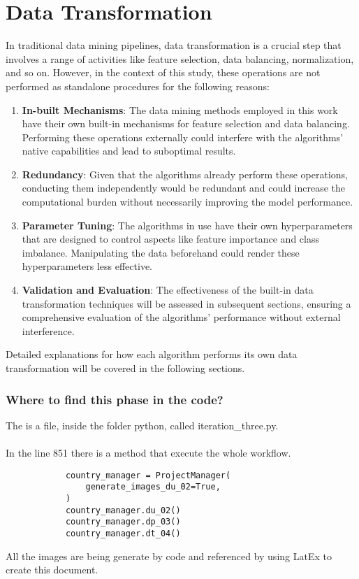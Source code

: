 \part{Data Transformation}

    In traditional data mining pipelines, data transformation is a crucial step that involves a range of activities like feature selection, data balancing, normalization, and so on. However, in the context of this study, these operations are not performed as standalone procedures for the following reasons:

    \begin{enumerate}
        \item \textbf{In-built Mechanisms}: The data mining methods employed in this work have their own built-in mechanisms for feature selection and data balancing. Performing these operations externally could interfere with the algorithms' native capabilities and lead to suboptimal results.

        \item \textbf{Redundancy}: Given that the algorithms already perform these operations, conducting them independently would be redundant and could increase the computational burden without necessarily improving the model performance.

        \item \textbf{Parameter Tuning}: The algorithms in use have their own hyperparameters that are designed to control aspects like feature importance and class imbalance. Manipulating the data beforehand could render these hyperparameters less effective.

        \item \textbf{Validation and Evaluation}: The effectiveness of the built-in data transformation techniques will be assessed in subsequent sections, ensuring a comprehensive evaluation of the algorithms' performance without external interference.
    \end{enumerate}

    Detailed explanations for how each algorithm performs its own data transformation will be covered in the following sections.


    \section{Where to find this phase in the code?}

        The is a file, inside the folder python, called iteration\_three.py.
        \\
        \\
        In the line 851 there is a method that execute the whole workflow.

        \begin{verbatim}
            country_manager = ProjectManager(
                generate_images_du_02=True,
            )
            country_manager.du_02()
            country_manager.dp_03()
            country_manager.dt_04()
        \end{verbatim}

        All the images are being generate by code and referenced by using LatEx to create this document.